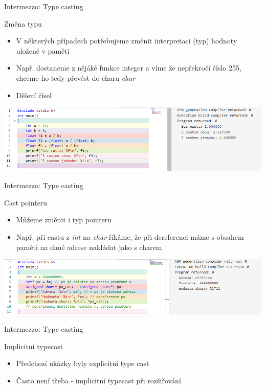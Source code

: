 \documentclass[9pt]{beamer}
\begin{document}
\begin{frame}{Intermezzo: Type casting}
    \begin{block}{Změna typu}
        \begin{itemize}
            \item V některých případech potřebujeme změnit interpretaci (typ) hodnoty uložené v paměti 
            \item Např. dostaneme z nějáké funkce integer a víme že nepřekročí číslo 255, chceme ho tedy převést do charu  \textit{char}
            \item Dělení čísel
        \end{itemize}
    \end{block}
    
    \includegraphics[width=0.87\linewidth]{lekce20/deleni.png}
\end{frame}

\begin{frame}{Intermezzo: Type casting}
    \begin{block}{Cast pointeru}
        \begin{itemize}
            \item Můžeme změnit i typ pointeru
            \item Např. při castu z \textit{int\*} na \textit{char\*} říkáme, že při dereferenci máme s obsahem paměti na dané adrese nakládat jako s charem
        \end{itemize}
    \end{block}
    \includegraphics[width=0.99\linewidth]{lekce20/pointer_cast.png}
\end{frame}

\begin{frame}{Intermezzo: Type casting}
    \begin{block}{Implicitní typecast}
        \begin{itemize}
            \item Předchozí ukázky byly explicitní type cast
            \item Často není třeba - implicitní typecast při rozšiřování
        \end{itemize}
    \end{block}
    
\end{frame}
\end{document}
